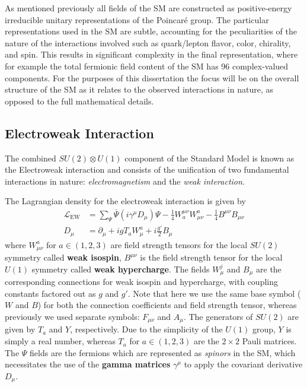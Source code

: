 As mentioned previously all fields of the SM are constructed as positive-energy irreducible unitary representations of the Poincar\'{e} group.
The particular representations used in the SM are subtle, accounting for the peculiarities of the nature of the interactions involved such as quark/lepton flavor, color, chirality, and spin.
This results in significant complexity in the final representation, where for example the total fermionic field content of the SM has 96 complex-valued components.
For the purposes of this dissertation the focus will be on the overall structure of the SM as it relates to the observed interactions in nature, as opposed to the full mathematical details.

\subsection{Electroweak Interaction}
The combined $SU(2) \otimes U(1)$ component of the Standard Model is known as the Electroweak interaction and consists of the unification of two fundamental interactions in nature: \textit{electromagnetism} and the \textit{weak interaction}.

The Lagrangian density for the electroweak interaction is given by
\begin{align}
    \mathcal{L}_{\mathrm{EW}} &= \sum_{\Psi}  \bar{\Psi}  (i \gamma^\mu D_\mu) \Psi - \frac{1}{4} W_a^{\mu\nu} W^a_{\mu\nu} - \frac{1}{4} B^{\mu\nu}B_{\mu\nu} \\
    D_\mu &= \partial_\mu + i g T_a W_\mu^a + i \frac{g'}{2} B_\mu
    \label{eq:ew_deriv}
\end{align}
where $W^a_{\mu\nu}$ for $a \in (1,2,3)$ are field strength tensors for the local $SU(2)$ symmetry called \textbf{weak isospin}, $B^{\mu\nu}$ is the field strength tensor for the local $U(1)$ symmetry called \textbf{weak hypercharge}.
The fields $W_\mu^j$ and $B_\mu$ are the corresponding connections for weak isospin and hypercharge, with coupling constants factored out as $g$ and $g'$. Note that here we use the same base symbol ($W$ and $B$) for both the connection coefficients and field strength tensor, whereas previously we used separate symbols: $F_{\mu\nu}$ and $A_\mu$.
The generators of $SU(2)$ are given by $T_a$ and $Y$, respectively.
Due to the simplicity of the $U(1)$ group, $Y$ is simply a real number, whereas $T_a$ for $a \in (1,2,3)$ are the $2\times2$ Pauli matrices.
The $\Psi$ fields are the fermions which are represented as \textit{spinors} in the SM, which necessitates the use of the \textbf{gamma matrices} $\gamma^\mu$ to apply the covariant derivative $D_\mu$.

